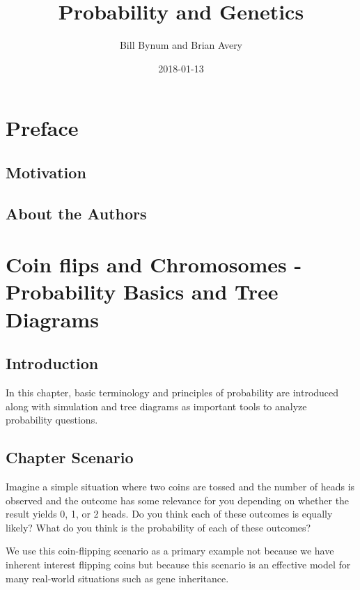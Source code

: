 \documentclass[]{book}
\title{Probability and Genetics}
\author{Bill Bynum and Brian Avery}
\date{2018-01-13}
\theoremstyle{definition}
\theoremstyle{definition}
\theoremstyle{definition}
\theoremstyle{remark}
\begin{document}
\maketitle

{
\setcounter{tocdepth}{1}
\tableofcontents
}
\chapter*{Preface}\label{preface}

\section{Motivation}\label{motivation}

\section{About the Authors}\label{about-the-authors}

\chapter{Coin flips and Chromosomes - Probability Basics and Tree
Diagrams}\label{basics}

\section{Introduction}\label{introduction}

In this chapter, basic terminology and principles of probability are
introduced along with simulation and tree diagrams as important tools to
analyze probability questions.

\section{Chapter Scenario}\label{chapter_scenario}

Imagine a simple situation where two coins are tossed and the number of
heads is observed and the outcome has some relevance for you depending
on whether the result yields 0, 1, or 2 heads. Do you think each of
these outcomes is equally likely? What do you think is the probability
of each of these outcomes?

We use this coin-flipping scenario as a primary example not because we
have inherent interest flipping coins but because this scenario is an
effective model for many real-world situations such as gene inheritance.
\end{document}
